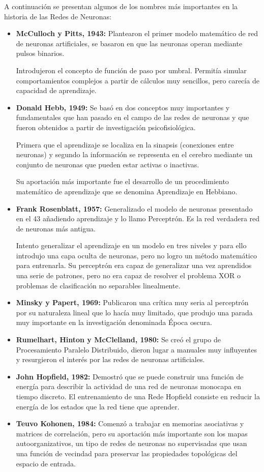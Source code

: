 \documentclass[12pt, twoside, openright]{report} %
\begin{document}
A continuación se presentan algunos de los nombres más importantes en la historia de las Redes de Neuronas:
\begin{itemize}
	\item \textbf{McCulloch y Pitts, 1943:} Plantearon el primer modelo matemático de red de neuronas artificiales, se basaron en que las neuronas operan mediante pulsos binarios.
	      
	      Introdujeron el concepto de función de paso por umbral. Permitía simular comportamientos complejos a partir de cálculos muy sencillos, pero carecía de capacidad de aprendizaje.
	\item \textbf{Donald Hebb, 1949:} Se basó en dos conceptos muy importantes y fundamentales que han pasado en el campo de las redes de neuronas y que fueron obtenidos a partir de investigación psicofisiológica.
	      
	      Primera que el aprendizaje se localiza en la sinapsis (conexiones entre neuronas) y segundo la información se representa en el cerebro mediante un conjunto de neuronas que pueden estar activas o inactivas. 
	      
	      Su aportación más importante fue el desarrollo de un procedimiento matemático de aprendizaje que se denomina Aprendizaje en Hebbiano.
	\item \textbf{Frank Rosenblatt, 1957:} Generalizado el modelo de neuronas presentado en el 43 añadiendo aprendizaje y lo llamo Perceptrón. Es la red verdadera red de neuronas más antigua.
	      
	      Intento generalizar el aprendizaje en un modelo en tres niveles y para ello introdujo una capa oculta de neuronas, pero no logro un método matemático para entrenarla. Su perceptrón era capaz de generalizar una vez aprendidos una serie de patrones, pero no era capaz de resolver el problema XOR o problemas de clasificación no separables linealmente.
	\item \textbf{Minsky y Papert, 1969:} Publicaron una crítica muy seria al perceptrón por su naturaleza lineal que lo hacía muy limitado, que produjo una parada muy importante en la investigación denominada Época oscura.
	\item \textbf{Rumelhart, Hinton y McClelland, 1980:} Se creó el grupo de Procesamiento Paralelo Distribuido, dieron lugar a manuales muy influyentes y resurgieron el interés por las redes de neuronas artificiales.
	\item \textbf{John Hopfield, 1982:} Demostró que se puede construir una función de energía para describir la actividad de una red de neuronas monocapa en tiempo discreto. El entrenamiento de una Rede Hopfield consiste en reducir la energía de los estados que la red tiene que aprender.
	\item \textbf{Teuvo Kohonen, 1984:} Comenzó a trabajar en memorias asociativas y matrices de correlación, pero su aportación más importante son los mapas autoorganizativos, un tipo de redes de neuronas no supervisadas que usan una función de vecindad para preservar las propiedades topológicas del espacio de entrada.
	      

\end{itemize}
\end{document}

